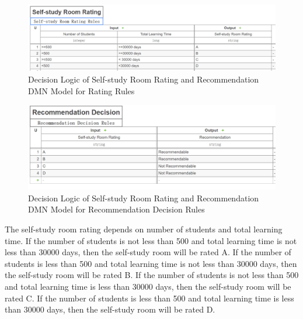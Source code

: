 \documentclass[runningheads]{llncs}
\begin{document}
\begin{figure}[H]
		\centering %
		\includegraphics[width=1.0\textwidth]{./figure/LLT/logic} %
		\caption{Decision Logic of Self-study Room Rating and Recommendation DMN Model for Rating Rules} %
		\label{2} %
	\end{figure}
\begin{figure}[H]
		\centering %
		\includegraphics[width=1.0\textwidth]{./figure/LLT/logicw} %
		\caption{Decision Logic of Self-study Room Rating and Recommendation DMN Model for Recommendation Decision Rules} %
		\label{1} %
	\end{figure}
The self-study room rating depends on number of students and total learning time. If the number of students is not less than 500 and total learning time is not less than 30000 days, then the self-study room will be rated A. If the number of students is less than 500 and total learning time is not less than 30000 days, then the self-study room will be rated B. If the number of students is not less than 500 and total learning time is less than 30000 days, then the self-study room will be rated C. If the number of students is less than 500 and total learning time is less than 30000 days, then the self-study room will be rated D.
\end{document}
